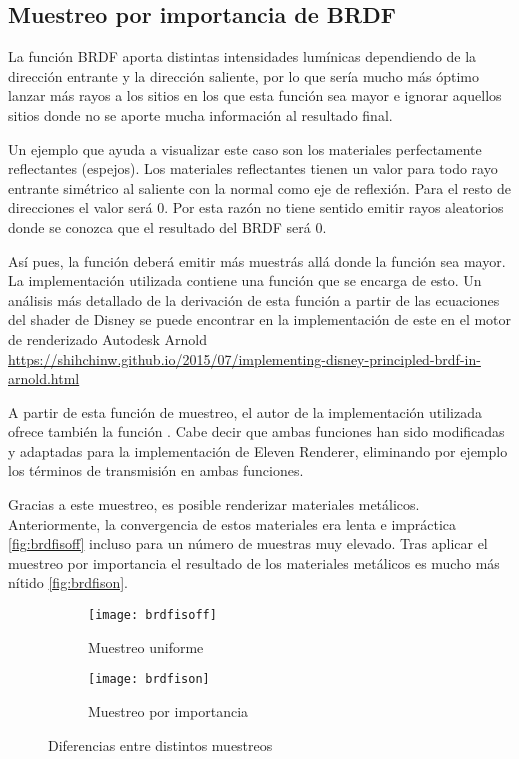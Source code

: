 \subsection{Muestreo por importancia de BRDF}

La función BRDF aporta distintas intensidades lumínicas dependiendo de la dirección entrante y la dirección saliente, por lo que sería mucho más óptimo lanzar más rayos a los sitios en los que esta función sea mayor e ignorar aquellos sitios donde no se aporte mucha información al resultado final.

Un ejemplo que ayuda a visualizar este caso son los materiales perfectamente reflectantes (espejos). Los materiales reflectantes tienen un valor  para todo rayo entrante simétrico al saliente con la normal como eje de reflexión. Para el resto de direcciones el valor será 0. Por esta razón no tiene sentido emitir rayos aleatorios donde se conozca que el resultado del BRDF será 0.

Así pues, la función  deberá emitir más muestrás allá donde la función  sea mayor. La implementación utilizada contiene una función  que se encarga de esto. Un análisis más detallado de la derivación de esta función a partir de las ecuaciones del shader de Disney se puede encontrar en la implementación de este en el motor de renderizado Autodesk Arnold \url{https://shihchinw.github.io/2015/07/implementing-disney-principled-brdf-in-arnold.html}

A partir de esta función de muestreo, el autor de la implementación utilizada ofrece también la función . Cabe decir que ambas funciones han sido modificadas y adaptadas para la implementación de Eleven Renderer, eliminando por ejemplo los términos de transmisión en ambas funciones.

Gracias a este muestreo, es posible renderizar materiales metálicos. Anteriormente, la convergencia de estos materiales era lenta e impráctica \autoref{fig:brdfisoff} incluso para un número de muestras muy elevado. Tras aplicar el muestreo por importancia el resultado de los materiales metálicos es mucho más nítido \autoref{fig:brdfison}.

\begin{figure}[H]
	\label{fig:brdfis}
	\centering
  \begin{subfigure}[b]{0.45\textwidth}
	\texttt{[image: brdfisoff]}
	\caption{Muestreo uniforme}
	\label{fig:brdfisoff}
  \end{subfigure}
  \hfill
  \begin{subfigure}[b]{0.45\textwidth}
	\texttt{[image: brdfison]}
	\caption{Muestreo por importancia}
	\label{fig:brdfison}
  \end{subfigure}
  \caption{Diferencias entre distintos muestreos}
\end{figure}

